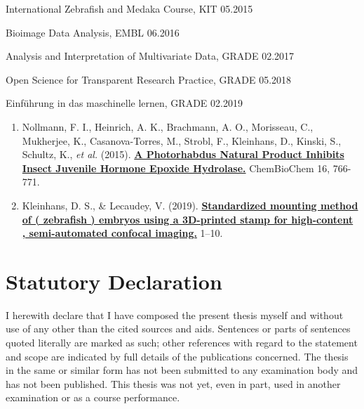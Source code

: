 \documentclass[11pt,singlespacinge,twoside]{reedthesis} %
\providecommand{\tightlist}{%
  \setlength{\itemsep}{0pt}\setlength{\parskip}{0pt}}
\theoremstyle{definition}
\theoremstyle{definition}
\theoremstyle{definition}
\theoremstyle{remark}
\begin{document}
 \hrulefill
\vspace{0.2cm}

\noindent International Zebrafish and Medaka Course, KIT \hfill 05.2015

\noindent Bioimage Data Analysis, EMBL \hfill 06.2016

\noindent Analysis and Interpretation of Multivariate Data, GRADE \hfill 02.2017

\noindent Open Science for Transparent Research Practice, GRADE \hfill 05.2018

\noindent Einführung in das maschinelle lernen, GRADE \hfill 02.2019

\vspace{0.3cm}

 \hrulefill
\begin{enumerate}
\def\labelenumi{\arabic{enumi}.}
\tightlist
\item
  Nollmann, F. I., Heinrich, A. K., Brachmann, A. O., Morisseau, C., Mukherjee, K., Casanova-Torres, M., Strobl, F., Kleinhans, D., Kinski, S., Schultz, K., \emph{et al.} (2015). \href{https://onlinelibrary.wiley.com/doi/abs/10.1002/cbic.201402650}{\textbf{A Photorhabdus Natural Product Inhibits Insect Juvenile Hormone Epoxide Hydrolase.}} ChemBioChem 16, 766-771.
\item
  Kleinhans, D. S., \& Lecaudey, V. (2019). \href{https://bmcbiotechnol.biomedcentral.com/track/pdf/10.1186/s12896-019-0558-y}{\textbf{Standardized mounting method of ( zebrafish ) embryos using a 3D-printed stamp for high-content , semi-automated confocal imaging.}} 1--10.
\end{enumerate}
\hypertarget{statutory-declaration}{%
\chapter*{\texorpdfstring{\textbf{Statutory Declaration}}{Statutory Declaration}}\label{statutory-declaration}}

I herewith declare that I have composed the present thesis myself and without use of any other than the
cited sources and aids. Sentences or parts of sentences quoted literally are marked as such; other references
with regard to the statement and scope are indicated by full details of the publications concerned. The thesis
in the same or similar form has not been submitted to any examination body and has not been published.
This thesis was not yet, even in part, used in another examination or as a course performance.
\end{document}
